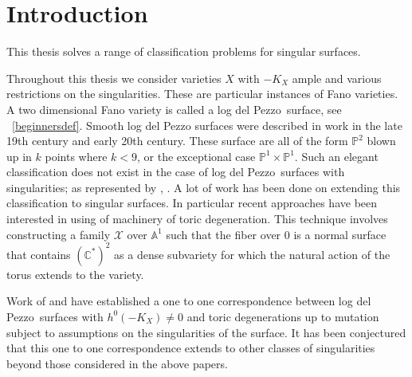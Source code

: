 \documentclass[12pt,a4paper]{book}      %
\theoremstyle{definition}
\newcommand{\C}[1]{(\mathbb{C}^*)^#1}
\newcommand{\ldp}{log del Pezzo}
\newcommand{\mb}[1]{\mathbb{#1}}
\begin{document}
\chapter{Introduction}

% 




%  
%  

This thesis solves a range of classification problems for singular surfaces.


Throughout this thesis we consider varieties $X$ with $-K_X$ ample and various restrictions on the singularities. These are particular instances of Fano varieties. A two dimensional Fano variety is called a \ldp\ surface, see ~\ref{beginnersdef}. Smooth log del Pezzo surfaces were described in work in the late 19th century and early 20th century. These surface are all of the form $\mb{P}^2$ blown up in $k$ points where $k <9 $, or the exceptional case $\mb{P}^1 \times \mb{P}^1$. Such an elegant classification does not exist in the case of \ldp\ surfaces with singularities; as represented by \cite{CH}, \cite{MR2053462}. A lot of work has been done on extending this classification to singular surfaces. In particular recent approaches have been interested in using of machinery of toric degeneration. This technique involves constructing a family $\mathcal{X}$ over $\mb{A}^1$ such that the fiber over $0$ is a normal surface that contains $\C{2}$ as a dense subvariety for which the natural action of the torus extends to the variety.  



 Work of \cite{CH} and \cite{Cuzz} have established a one to one correspondence between \ldp\ surfaces with $h^0(-K_X) \neq 0$ and toric degenerations up to mutation subject to assumptions on the singularities of the surface. It has been conjectured that this one to one correspondence extends to other classes of singularities beyond those considered in the above papers. 
 
\end{document}

